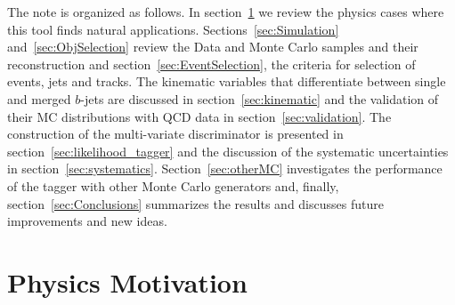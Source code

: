 The note is organized as follows. In section~\ref{sec:motivation} we review the physics cases where this tool finds natural applications. Sections~\ref{sec:Simulation} and~\ref{sec:ObjSelection} review the Data and Monte Carlo samples and their reconstruction and section~\ref{sec:EventSelection}, the criteria for selection of events, jets and tracks. The kinematic variables that differentiate between single and merged $b$-jets are discussed in section~\ref{sec:kinematic} and the validation of their MC distributions with QCD data in section~\ref{sec:validation}.  The construction of the multi-variate discriminator is presented in section~\ref{sec:likelihood_tagger} and the discussion of the systematic uncertainties in section~\ref{sec:systematics}. Section~\ref{sec:otherMC} investigates the performance of the tagger with other Monte Carlo generators and, finally, section~\ref{sec:Conclusions} summarizes the results and discusses future improvements and new ideas. %


\section{Physics Motivation}\label{sec:motivation}


